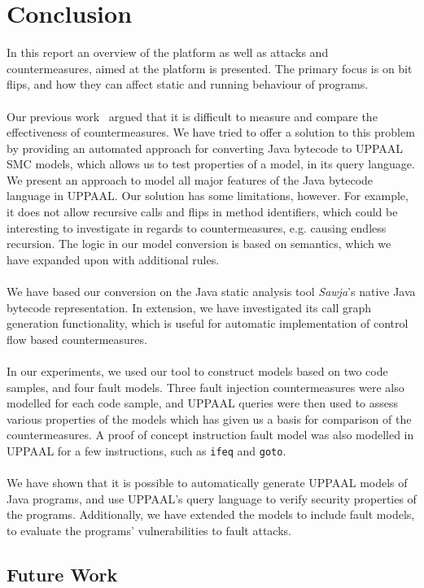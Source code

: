 \chapter{Conclusion}
In this report an overview of the \jc platform as well as attacks and countermeasures, aimed at the platform is presented. The primary focus is on bit flips, and how they can affect static and running behaviour of programs.\\\\
Our previous work~\cite{javasec} argued that it is difficult to measure and compare the effectiveness of countermeasures. We have tried to offer a solution to this problem by providing an automated approach for converting Java bytecode to UPPAAL SMC models, which allows us to test properties of a model, in its query language. We present an approach to model all major features of the Java bytecode language in UPPAAL. Our solution has some limitations, however. For example, it does not allow recursive calls and flips in method identifiers, which could be interesting to investigate in regards to countermeasures, e.g. causing endless recursion. The logic in our model conversion is based on \jcl semantics, which we have expanded upon with additional rules.\\\\
We have based our conversion on the Java static analysis tool \textit{Sawja}'s native Java bytecode representation. In extension, we have investigated its call graph generation functionality, which is useful for automatic implementation of control flow based countermeasures.\\\\
In our experiments, we used our tool to construct models based on two code samples, and four fault models. Three fault injection countermeasures were also modelled for each code sample, and UPPAAL queries were then used to assess various properties of the models which has given us a basis for comparison of the countermeasures. A proof of concept instruction fault model was also modelled in UPPAAL for a few instructions, such as \texttt{ifeq} and \texttt{goto}.\\\\
We have shown that it is possible to automatically generate UPPAAL models of Java programs, and use UPPAAL's query language to verify security properties of the programs. Additionally, we have extended the models to include fault models, to evaluate the programs' vulnerabilities to fault attacks.
\section{Future Work}

